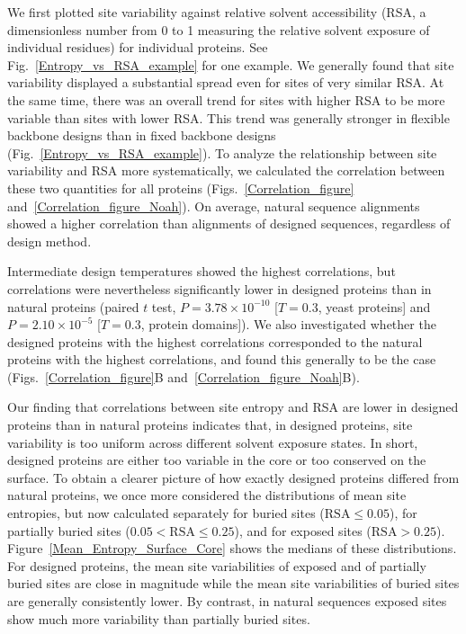 \documentclass[12pt]{article}
\begin{document}
We first plotted site variability against relative solvent accessibility (RSA, a dimensionless number from 0 to 1 measuring the relative solvent exposure of individual residues) for individual proteins. See Fig.~\ref{Entropy_vs_RSA_example} for one example. We generally found that site variability displayed a substantial spread even for sites of very similar RSA. At the same time, there was an overall trend for sites with higher RSA to be more variable than sites with lower RSA. This trend was generally stronger in flexible backbone designs than in fixed backbone designs (Fig.~\ref{Entropy_vs_RSA_example}). To analyze the relationship between site variability and RSA more systematically, we calculated the correlation between these two quantities for all proteins (Figs.~\ref{Correlation_figure} and~\ref{Correlation_figure_Noah}). On average, natural sequence alignments showed a higher correlation than alignments of designed sequences, regardless of design method. 

Intermediate design temperatures showed the highest correlations, but correlations were nevertheless significantly lower in designed proteins than in natural proteins (paired $t$ test, $P=3.78\times 10^{-10}$ [$T=0.3$, yeast proteins] and $P= 2.10\times 10^{-5}$ [$T=0.3$, protein domains]).  We also investigated whether the designed proteins with the highest correlations corresponded to the natural proteins with the highest correlations, and found this generally to be the case (Figs.~\ref{Correlation_figure}B and~\ref{Correlation_figure_Noah}B).

Our finding that correlations between site entropy and RSA are lower in designed proteins than in natural proteins indicates that, in designed proteins, site variability is too uniform across different solvent exposure states. In short, designed proteins are either too variable in the core or too conserved on the surface. To obtain a clearer picture of how exactly designed proteins differed from natural proteins, we once more considered the distributions of mean site entropies, but now calculated separately for buried sites ($\text{RSA}\leq0.05$), for partially buried sites ($0.05<\text{RSA}\leq0.25$), and for exposed sites ($\text{RSA}>0.25$). Figure~\ref{Mean_Entropy_Surface_Core} shows the medians of these distributions. For designed proteins, the mean site variabilities of exposed and of partially buried sites are close in magnitude while the mean site variabilities of buried sites are generally consistently lower. By contrast, in natural sequences exposed sites show much more variability than partially buried sites.
\end{document}
